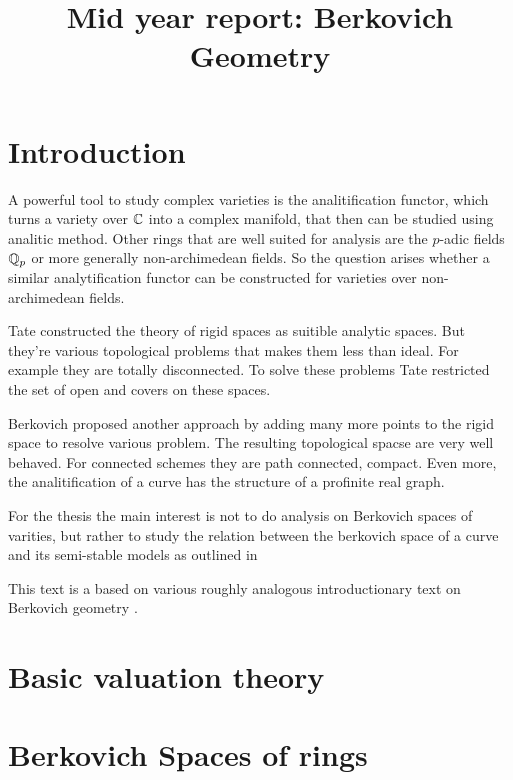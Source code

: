 \documentclass[a4paper]{article}
\title{Mid year report: Berkovich Geometry}
\begin{document}
\maketitle

\tableofcontents

\pagebreak

\section{Introduction} \label{sec:introduction}

A powerful tool to study complex varieties is the analitification functor, which turns a variety over $\mathbb{C}$ into a complex manifold, that then can be studied using analitic method. 
Other rings that are well suited for analysis are the $p$-adic fields $\mathbb{Q}_p$ or more generally non-archimedean fields. 
So the question arises whether a similar analytification functor can be constructed for  varieties over non-archimedean fields. 

Tate constructed the theory of rigid spaces as suitible analytic spaces. But they're various topological problems that makes them less than ideal. For example they are totally disconnected. To solve these problems Tate restricted the set of open and covers on these spaces. 

Berkovich proposed another approach by adding many more points to the rigid space to resolve various problem. 
The resulting topological spacse are very well behaved. For connected schemes they are path connected, compact. Even more, the analitification of a curve has the structure of a profinite real graph. 

For the thesis the main interest is not to do analysis on Berkovich spaces of varities, but rather to study the relation between the berkovich space of a curve and its semi-stable models as outlined in \cite{bakerStructureNonarchimedeanAnalytic2013}

This text is a based on various roughly analogous introductionary text on Berkovich geometry \cite{bakerarizona,temkinIntroductionBerkovichAnalytic2010,nicaiseNONARCHIMEDEANGEOMETRY,boschLecturesFormalRigid2014}. 

\section{Basic valuation theory} \label{sec:basic_valuation_theory}



\section{Berkovich Spaces of rings} \label{sec:berkovich_spaces}

\end{document}
